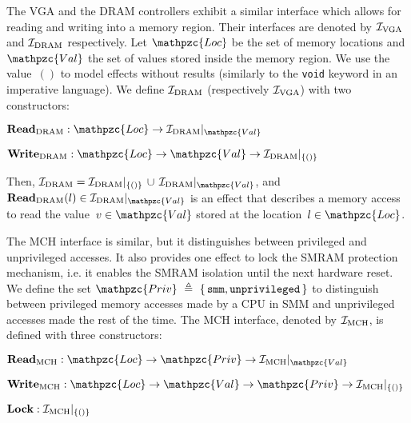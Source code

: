 \begin{example}
  The VGA and the DRAM controllers exhibit a similar interface which allows for
  reading and writing into a memory region.
  Their interfaces are denoted by $\mathcal{I}_{\mathrm{VGA}}$ and $\mathcal{I}_{\mathrm{DRAM}}$
  respectively.
  Let $\mathpzc{Loc}$ be the set of memory locations and $\mathpzc{Val}$ the
  set of values stored inside the memory region.
  We use the value~$()$ to model effects without results (similarly to
  the \texttt{void} keyword in an imperative language).
  We define $\mathcal{I}_{\mathrm{DRAM}}$ (respectively $\mathcal{I}_{\mathrm{VGA}}$) with two constructors:
  \begin{compactitem}
  \item
    $\func{Read}_{\mathrm{DRAM}} : \mathpzc{Loc} \rightarrow
    \Interface{\I_{\mathrm{DRAM}}}{\mathpzc{Val}}$
  \item
    $\func{Write}_{\mathrm{DRAM}} : \mathpzc{Loc} \rightarrow \mathpzc{Val}
    \rightarrow \Interface{\I_{\mathrm{DRAM}}}{\{()\}}$
  \end{compactitem}

  Then, $\I_{\mathrm{DRAM}} =
  \Interface{\I_{\mathrm{DRAM}}}{\{()\}}\,\cup\,\Interface{\I_{\mathrm{DRAM}}}{\mathpzc{Val}}$,
  and
  $\func{Read}_{\mathrm{DRAM}}(l) \in
  \Interface{\I_{\mathrm{DRAM}}}{\mathpzc{Val}}$ is an effect that describes a
  memory access to read the value~$v \in \mathpzc{Val}$ stored at the
  location~$l \in \mathpzc{Loc}$.

  The MCH interface is similar, but it distinguishes between privileged and
  unprivileged accesses.
  It also provides one effect to lock the SMRAM protection mechanism, i.e. it
  enables the SMRAM isolation until the next hardware reset.
  We define the set $\mathpzc{Priv}~\triangleq~\{\,\val{smm},
  \val{unprivileged}\,\}$ to distinguish between privileged memory accesses
  made by a CPU in SMM and unprivileged accesses made the rest of the time.
  The MCH interface, denoted by $\mathcal{I}_{\mathrm{MCH}}$, is defined with three constructors:
  \begin{compactitem}
  \item
    $\func{Read}_{\mathrm{MCH}} : \mathpzc{Loc} \rightarrow \mathpzc{Priv} \rightarrow
    \Interface{\I_{\mathrm{MCH}}}{\mathpzc{Val}}$
  \item
    $\func{Write}_{\mathrm{MCH}} : \mathpzc{Loc} \rightarrow \mathpzc{Val} \rightarrow
    \mathpzc{Priv} \rightarrow \Interface{\I_{\mathrm{MCH}}}{\{()\}}$
  \item $\mathbf{\mathbf{Lock}} : \mathcal{I}_{\mathrm{MCH}}|_{\{()\}}$
  \end{compactitem}
\end{example}


